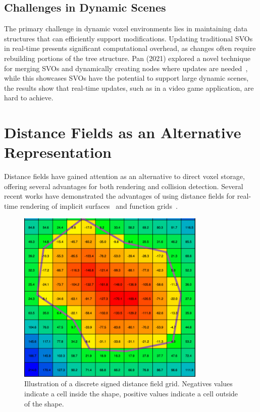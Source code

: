 \subsection{Challenges in Dynamic Scenes}
The primary challenge in dynamic voxel environments lies in maintaining data structures that can efficiently support
modifications. Updating traditional SVOs in real-time presents significant computational overhead, as changes often
require rebuilding portions of the tree structure. Pan (2021) explored a novel technique for merging SVOs and
dynamically creating nodes where updates are needed~\cite{pan2021dynamic}, while this showcases SVOs have the potential
to support large dynamic scenes, the results show that real-time updates, such as in a video game application, are hard
to achieve.

\section{Distance Fields as an Alternative Representation}
Distance fields have gained attention as an alternative to direct voxel storage, offering several advantages for both
rendering and collision detection. Several recent works have demonstrated the advantages of using distance fields for
real-time rendering of implicit surfaces~\cite{hadji2021raymarching} and function grids~\cite{soderlund2022ray}.

\begin{figure}[thp]
    \caption{Illustration of a discrete signed distance field grid. Negatives values indicate a cell inside the shape,
    positive values indicate a cell outside of the shape.}
    \begin{center}
        \includegraphics[width=0.8\textwidth]{figures/distance_field.png}
    \end{center}
\end{figure}

